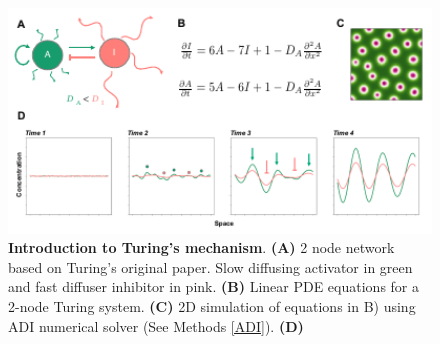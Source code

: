 \begin{figure}[h!]
    \centering
    \includegraphics[width=1\textwidth]{chapters/Introduction/intro_to_turing_patterns}
    \caption[\textbf{Introduction to Turing's mechanism of pattern formation}]{\textbf{Introduction to Turing's mechanism}. \textbf{(A)} 2 node network based on Turing's original paper. Slow diffusing activator in green and fast diffuser inhibitor in pink. \textbf{(B)} Linear PDE equations for a 2-node Turing system. \textbf{(C)} 2D simulation of equations in B) using ADI numerical solver (See Methods \ref{ADI}). \textbf{(D)} }
    \label{fig:intro_to_turing_patterns}
\end{figure}


